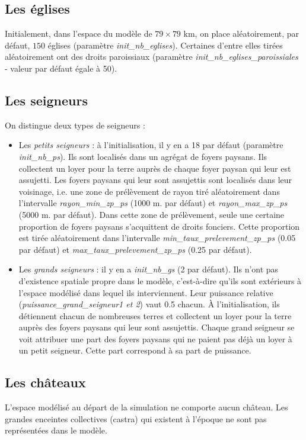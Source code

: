 \documentclass[a4paper,11pt]{article}
\begin{document}
\subsection{Les églises}
\begin{sloppypar}
Initialement, dans l'espace du modèle de $79 \times 79$ km, on place aléatoirement, par défaut, $150$ églises (paramètre \textit{init\_nb\_eglises}). Certaines d'entre elles tirées aléatoirement ont des droits paroissiaux (paramètre \textit{init\_nb\_eglises\_paroissiales} - valeur par défaut égale à 50).
\end{sloppypar}

\subsection{Les seigneurs}
On distingue deux types de seigneurs :
\begin{itemize}
\item Les \textit{petits seigneurs} : à l'initialisation, il y en a 18 par défaut (paramètre \textit{init\_nb\_ps}). Ils sont localisés dans un agrégat de foyers paysans. Ils collectent un loyer pour la terre auprès de chaque foyer paysan qui leur est assujetti. Les foyers paysans qui leur sont assujettis sont localisés dans leur voisinage, i.e. une zone de prélèvement de rayon tiré aléatoirement dans l'intervalle \textit{rayon\_min\_zp\_ps} (1000 m. par défaut) et \textit{rayon\_max\_zp\_ps} (5000 m. par défaut). Dans cette zone de prélèvement, seule une certaine proportion de foyers paysans s'acquittent de droits fonciers. Cette proportion est tirée aléatoirement dans l'intervalle \textit{min\_taux\_prelevement\_zp\_ps} (0.05 par défaut) et \textit{max\_taux\_prelevement\_zp\_ps} (0.25 par défaut).

\item Les \textit{grands seigneurs} : il y en a \textit{init\_nb\_gs} (2 par défaut). Ils n'ont pas d'existence spatiale propre dans le modèle, c'est-à-dire qu'ils sont extérieurs à l'espace modélisé dans lequel ils interviennent. Leur puissance relative (\textit{puissance\_grand\_seigneur1 et 2}) vaut 0.5 chacun. À  l'initialisation, ils détiennent chacun de nombreuses terres et collectent un loyer pour la terre auprès des foyers paysans qui leur sont assujettis. Chaque grand seigneur se voit attribuer une part des foyers paysans qui ne paient pas déjà un loyer à un petit seigneur. Cette part correspond à sa part de puissance.
\end{itemize}

\subsection{Les châteaux}
L'espace modélisé au départ de la simulation ne comporte aucun château. Les grandes enceintes collectives (castra) qui existent à l'époque ne sont pas représentées dans le modèle.
\end{document}
